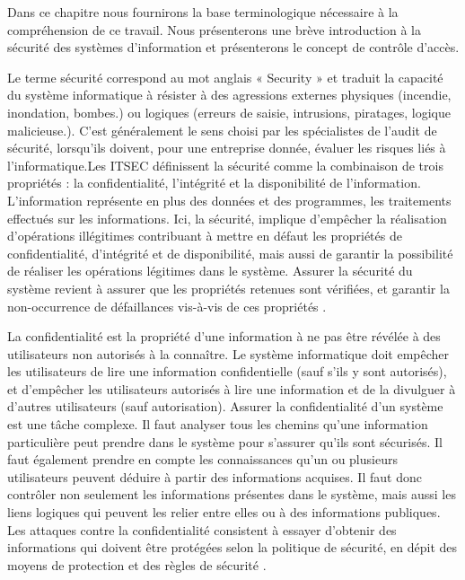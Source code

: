 \label{chapGénéralité}



Dans ce chapitre nous fournirons la base terminologique nécessaire à la compréhension de ce travail. Nous présenterons une brève introduction à la sécurité des systèmes d'information et présenterons le concept de contrôle d'accès.

\label{sectionSécuritéSI}

\label{sectionSécurité}
Le terme sécurité correspond au mot anglais « Security » et traduit la capacité du système informatique à résister à des agressions externes physiques (incendie, inondation, bombes.) ou logiques (erreurs de saisie, intrusions, piratages, logique malicieuse.). C'est généralement le sens choisi par les spécialistes de l'audit de sécurité, lorsqu'ils doivent, pour une entreprise donnée, évaluer les risques liés à l'informatique.Les ITSEC \cite{jahl91} définissent la sécurité comme la combinaison de trois propriétés : la confidentialité, l'intégrité et la disponibilité de l'information. L'information représente en plus des données et des programmes, les traitements effectués sur les informations. Ici, la sécurité, implique d'empêcher la réalisation d'opérations illégitimes contribuant à mettre en défaut les propriétés de confidentialité, d'intégrité et de disponibilité, mais aussi de garantir la possibilité de réaliser les opérations légitimes dans le système. Assurer la sécurité du système revient à assurer que les propriétés retenues sont vérifiées, et garantir la non-occurrence de défaillances vis-à-vis de ces propriétés \cite{theseBenoit}.

\label{sectionConfidentialité}
  La confidentialité est la propriété d'une information à ne pas être révélée à des utilisateurs non autorisés à la connaître. Le système informatique doit empêcher les utilisateurs de lire une information confidentielle (sauf s'ils y sont autorisés), et d'empêcher les utilisateurs autorisés à lire une information et de la divulguer à d'autres utilisateurs (sauf autorisation). Assurer la confidentialité d'un système est une tâche complexe. Il faut analyser tous les chemins qu'une information particulière peut prendre dans le système pour s'assurer qu'ils sont sécurisés. Il faut également prendre en compte les connaissances qu'un ou plusieurs utilisateurs peuvent déduire à partir des informations acquises. Il faut donc contrôler non seulement les informations présentes dans le système, mais aussi les liens logiques qui peuvent les relier entre elles ou à des informations publiques. Les attaques contre la confidentialité consistent à essayer d'obtenir des informations qui doivent être protégées selon la politique de sécurité, en dépit des moyens de protection et des règles de sécurité \cite{theseBenoit}.

